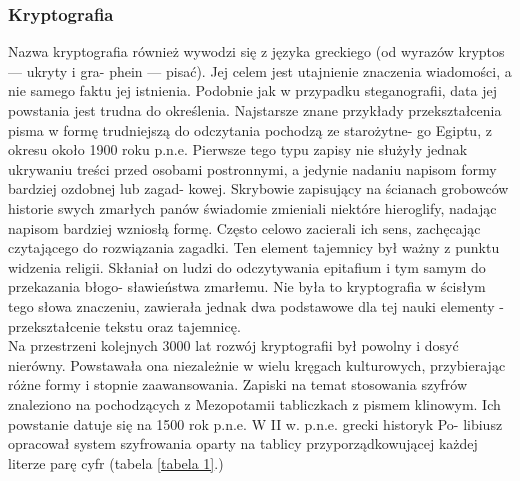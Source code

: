 \documentclass[a4paper]{article}
\begin{document}
\subsubsection{Kryptografia}
Nazwa kryptografia również wywodzi się z języka greckiego (od wyrazów kryptos — ukryty i gra-
phein — pisać). Jej celem jest utajnienie znaczenia wiadomości, a nie samego faktu jej istnienia.
Podobnie jak w przypadku steganografii, data jej powstania jest trudna do określenia. Najstarsze
znane przykłady przekształcenia pisma w formę trudniejszą do odczytania pochodzą ze starożytne-
go Egiptu, z okresu około 1900 roku p.n.e. Pierwsze tego typu zapisy nie służyły jednak ukrywaniu
treści przed osobami postronnymi, a jedynie nadaniu napisom formy bardziej ozdobnej lub zagad-
kowej. Skrybowie zapisujący na ścianach grobowców historie swych zmarłych panów świadomie
zmieniali niektóre hieroglify, nadając napisom bardziej wzniosłą formę. Często celowo zacierali ich
sens, zachęcając czytającego do rozwiązania zagadki. Ten element tajemnicy był ważny z punktu
widzenia religii. Skłaniał on ludzi do odczytywania epitafium i tym samym do przekazania błogo-
sławieństwa zmarłemu. Nie była to kryptografia w ścisłym tego słowa znaczeniu, zawierała jednak
dwa podstawowe dla tej nauki elementy - przekształcenie tekstu oraz tajemnicę.\\
Na przestrzeni kolejnych 3000 lat rozwój kryptografii był powolny i dosyć nierówny. Powstawała
ona niezależnie w wielu kręgach kulturowych, przybierając różne formy i stopnie zaawansowania.
Zapiski na temat stosowania szyfrów znaleziono na pochodzących z Mezopotamii tabliczkach z
pismem klinowym. Ich powstanie datuje się na 1500 rok p.n.e. W II w. p.n.e. grecki historyk Po-
libiusz opracował system szyfrowania oparty na tablicy przyporządkowującej każdej literze parę
cyfr (tabela \ref{tabela 1}.)\\
\end{document}
